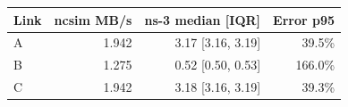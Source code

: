 \begin{tabular}{lrrr}
\toprule
Link & ncsim MB/s & ns-3 median [IQR] & Error p95 \\
\midrule
A & 1.942 & 3.17 [3.16, 3.19] & 39.5\% \\
B & 1.275 & 0.52 [0.50, 0.53] & 166.0\% \\
C & 1.942 & 3.18 [3.16, 3.19] & 39.3\% \\
\bottomrule
\end{tabular}
